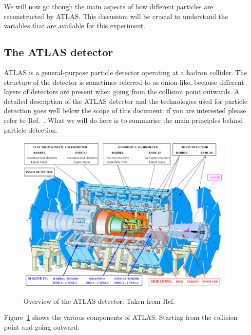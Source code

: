 
We will now go though the main aspects of how different particles are reconstructed by ATLAS. This discussion will be crucial to understand the variables that are available for this experiment. 

\subsection{The ATLAS detector}

ATLAS is a general-purpose particle detector operating at a hadron collider. The structure of the detector is sometimes referred to as onion-like, because different layers of detectors are present when going from the collision point outwards. A detailed description of the ATLAS detector and the technologies used for particle detection goes well below the scope of this document: if you are interested please refer to Ref.~\cite{Aad:2008zzm}. What we will do here is to summarise the main principles behind particle detection.

\begin{figure}[tb] 
	\centering
	\includegraphics[width=0.7\columnwidth]{Figures/atlas.png}
	\label{fig:ATLAS}
	\caption{Overview of the ATLAS detector. Taken from Ref.~\cite{ATLAS_detector_image}}
\end{figure}

Figure~\ref{fig:ATLAS} shows the various components of ATLAS. Starting from the collision point and going outward: 

